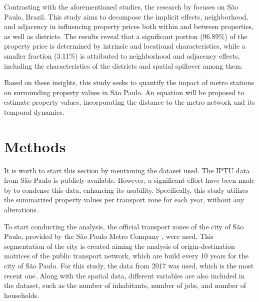 \documentclass[12pt]{gsis} %
\begin{document}
Contrasting with the aforementioned studies, the research by \citet{campos_almeida_2018} focuses on São Paulo, Brazil.
This study aims to decompose the implicit effects, neighborhood, and adjacency in influencing property prices both within and between properties, as well as districts.
The results reveal that a significant portion (96.89\%) of the property price is determined by intrinsic and locational characteristics, while a smaller fraction (3.11\%) is attributed to neighborhood and adjacency effects, including the characteristics of the districts and spatial spillover among them.

Based on these insights, this study seeks to quantify the impact of metro stations on surrounding property values in São Paulo.
An equation will be proposed to estimate property values, incorporating the distance to the metro network and its temporal dynamics.

\section{Methods}


It is worth to start this section by mentioning the dataset used.
The IPTU data from São Paulo is publicly available.
However, a significant effort have been made by \citet{Gomes_2022} to condense this data, enhancing its usability.
Specifically, this study utilizes the summarized property values per transport zone for each year, without any alterations.


To start conducting the analysis, the official transport zones of the city of São Paulo, provided by the São Paulo Metro Company \citep{MetroSP2017Pesquisa}, were used.
This segmentation of the city is created aiming the analysis of origin-destination matrices of the public transport network, which are build every 10 years for the city of São Paulo.
For this study, the data from 2017 was used, which is the most recent one.
Along with the spatial data, different variables are also included in the dataset, such as the number of inhabitants, number of jobs, and number of households.
\end{document}
